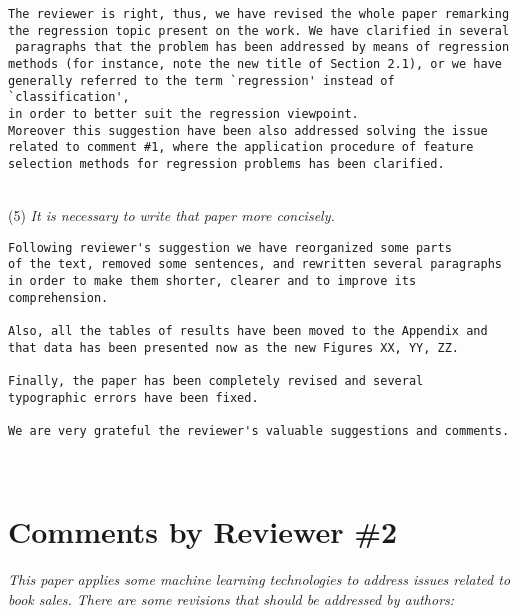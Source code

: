 \documentclass[preprint]{elsarticle}
\begin{document}
\begin{verbatim}
The reviewer is right, thus, we have revised the whole paper remarking 
the regression topic present on the work. We have clarified in several
 paragraphs that the problem has been addressed by means of regression 
methods (for instance, note the new title of Section 2.1), or we have 
generally referred to the term `regression' instead of `classification', 
in order to better suit the regression viewpoint.
Moreover this suggestion have been also addressed solving the issue 
related to comment #1, where the application procedure of feature 
selection methods for regression problems has been clarified. 
\end{verbatim}

~\\
\noindent (5) \emph{It is necessary to write that paper more concisely. } 

\begin{verbatim}
Following reviewer's suggestion we have reorganized some parts 
of the text, removed some sentences, and rewritten several paragraphs 
in order to make them shorter, clearer and to improve its comprehension. 

Also, all the tables of results have been moved to the Appendix and 
that data has been presented now as the new Figures XX, YY, ZZ.

Finally, the paper has been completely revised and several 
typographic errors have been fixed. 

We are very grateful the reviewer's valuable suggestions and comments. 
\end{verbatim}


~\\

\section{Comments by Reviewer \#2}

\noindent \emph{This paper applies some machine learning technologies to address issues related to book sales. There are some revisions that should be addressed by authors: } \\
\end{document}
